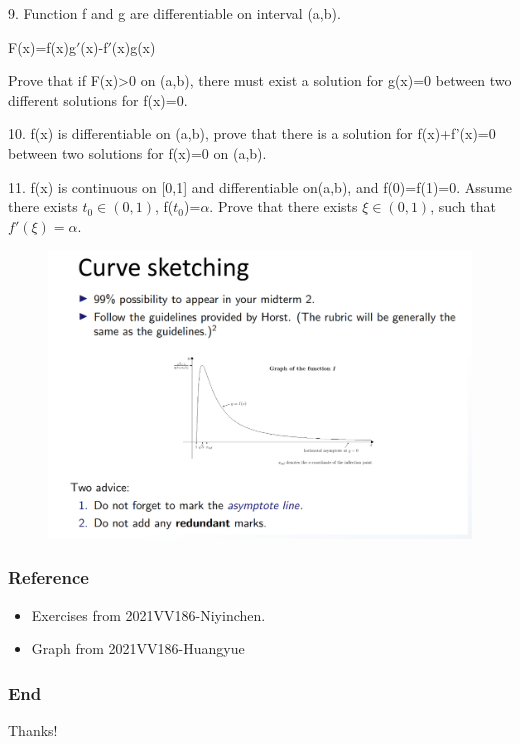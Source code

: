 \documentclass{beamer}
\begin{document}
\begin{frame}
    9. Function f and g are differentiable on interval (a,b).
    \begin{center}
        F(x)=f(x)g$'$(x)-f$'$(x)g(x)
    \end{center}
    Prove that if F(x)>0 on (a,b), there must exist a solution for g(x)=0 between two different solutions for f(x)=0.
\end{frame}

\begin{frame}
    10. f(x) is differentiable on (a,b), prove that there is a solution for f(x)+f'(x)=0 between two solutions for f(x)=0 on (a,b).
\end{frame}

\begin{frame}
    11. f(x) is continuous on [0,1] and differentiable on(a,b), and f(0)=f(1)=0. Assume there exists $t_{0}\in (0,1)$, f($t_{0}$)=$\alpha$. Prove that there exists $\xi\in(0,1)$, such that $f'(\xi)=\alpha$.
\end{frame}

\begin{frame}
    \begin{figure}[htbp]
        \centering
        \includegraphics[width=12cm]{sketching.png}
    \end{figure}
\end{frame}

\begin{frame}
    \frametitle{Reference}
    \begin{itemize}
        \item Exercises from 2021VV186-Niyinchen.
        \item Graph from 2021VV186-Huangyue
    \end{itemize}
\end{frame}
\begin{frame}
    \frametitle{End}
    \centering
    \LARGE{Thanks!}


\end{frame}
\end{document}
